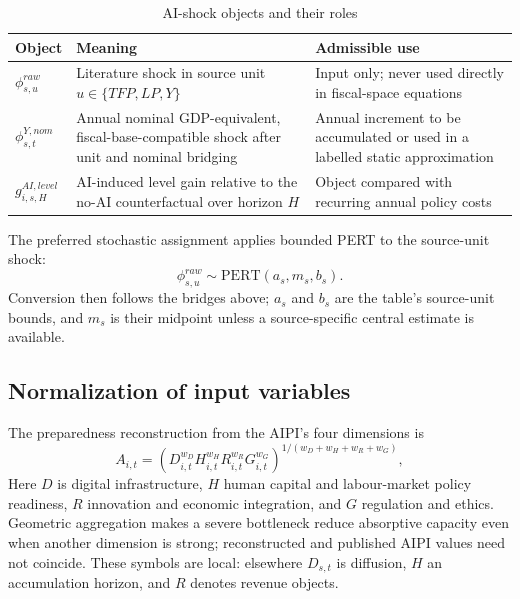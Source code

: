 \documentclass[11pt,a4paper]{article}
\begin{document}
\begin{table}[H]
\centering
\caption{AI-shock objects and their roles}
\label{tab:ai_shock_objects_v17}
\small
\begin{tabular}{p{}p{}p{}}
\toprule
Object & Meaning & Admissible use \\
\midrule
$\phi^{raw}_{s,u}$ & Literature shock in source unit $u\in\{TFP,LP,Y\}$ & Input only; never used directly in fiscal-space equations \\
$\phi^{Y,nom}_{s,t}$ & Annual nominal GDP-equivalent, fiscal-base-compatible shock after unit and nominal bridging & Annual increment to be accumulated or used in a labelled static approximation \\
$g^{AI,level}_{i,s,H}$ & AI-induced level gain relative to the no-AI counterfactual over horizon $H$ & Object compared with recurring annual policy costs \\
\bottomrule
\end{tabular}
\end{table}
The preferred stochastic assignment applies bounded PERT to the source-unit shock:
\begin{equation}
    \phi^{raw}_{s,u}\sim \mathrm{PERT}(a_s,m_s,b_s).
\end{equation}
Conversion then follows the bridges above; $a_s$ and $b_s$ are the table's source-unit bounds, and $m_s$ is their midpoint unless a source-specific central estimate is available.


\subsection{Normalization of input variables}

The preparedness reconstruction from the AIPI's four dimensions is
\begin{equation}
    A_{i,t}=\left(D_{i,t}^{w_D}H_{i,t}^{w_H}R_{i,t}^{w_R}G_{i,t}^{w_G}\right)^{1/(w_D+w_H+w_R+w_G)},
\end{equation}
Here $D$ is digital infrastructure, $H$ human capital and labour-market policy readiness, $R$ innovation and economic integration, and $G$ regulation and ethics. Geometric aggregation makes a severe bottleneck reduce absorptive capacity even when another dimension is strong; reconstructed and published AIPI values need not coincide. These symbols are local: elsewhere $D_{s,t}$ is diffusion, $H$ an accumulation horizon, and $R$ denotes revenue objects.
\end{document}
